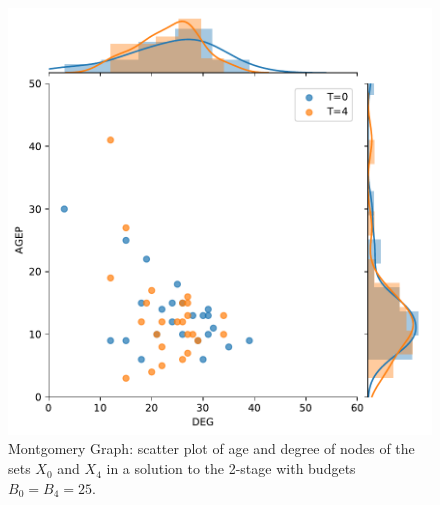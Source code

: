 \begin{figure}[!h]
    \centering
    \includegraphics[scale = 0.5]{figures/t0_t4_compare_age_deg.pdf}
    \caption{Montgomery Graph: scatter plot of age and degree of nodes of the sets $X_0$ and $X_4$ in a solution to the 2-stage \prob{} with budgets $B_0 = B_4 = 25$.}
    \label{fig:montagedeg}
\end{figure}

\



